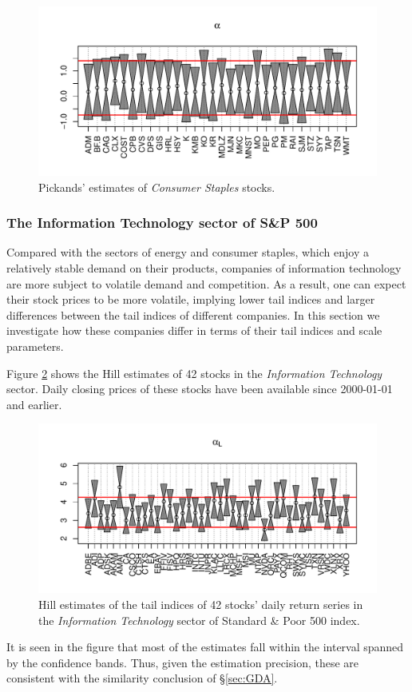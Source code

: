 \documentclass{article}
\newcommand{\1}[1]{
  \mathbf{1}_{\{#1\}}
}
\begin{document}
\begin{figure}[htb!]
  \includegraphics[width=\textwidth]{Consumer_Staples_Pickands.pdf}
  \caption{Pickands' estimates of {\it Consumer Staples} stocks.}
  \label{fig:Consumer_Staples_Pickands}
\end{figure}

\subsubsection{The Information Technology sector of S\&P 500}
Compared with the sectors of energy and consumer staples, which enjoy
a relatively stable demand on their products, companies of information
technology are more subject to volatile demand and competition. As a
result, one can expect their stock prices to be more volatile, implying
lower tail indices and larger differences between the tail indices of
different companies. In this section we investigate how these companies
differ in terms of their tail indices and scale parameters.

Figure \ref{fig:Information_Technology_Hill} shows the Hill
estimates of 42 stocks in the {\it Information Technology} sector. Daily
closing prices of these stocks have been available since 2000-01-01 and
earlier.
\begin{figure}[htb!]
  \centering
  \includegraphics[width=\textwidth]{Information_Technology_Hill.pdf}
  \caption{Hill estimates of the tail indices of 42 stocks' daily
    return series in the {\it Information Technology} sector of Standard
    \& Poor 500 index.
  }
  \label{fig:Information_Technology_Hill}
\end{figure}
It is seen in the figure that most of the estimates fall within the
interval spanned by the confidence bands. Thus, given the estimation
precision, these are consistent with the similarity conclusion of 
\S\ref{sec:GDA}.
\end{document}
